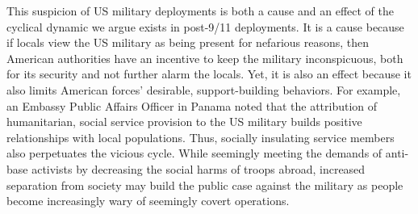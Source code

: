 This suspicion of US military deployments is both a cause and an effect of the cyclical dynamic we argue exists in post-9/11 deployments. It is a cause because if locals view the US military as being present for nefarious reasons, then American authorities have an incentive to keep the military inconspicuous, both for its security and not further alarm the locals. Yet, it is also an effect because it also limits American forces' desirable, support-building behaviors. For example, an Embassy Public Affairs Officer in Panama noted that the attribution of humanitarian, social service provision to the US military builds positive relationships with local populations.\autocite{embone20180712} Thus, socially insulating service members also perpetuates the vicious cycle. While seemingly meeting the demands of anti-base activists by decreasing the social harms of troops abroad, increased separation from society may build the public case against the military as people become increasingly wary of seemingly covert operations.


